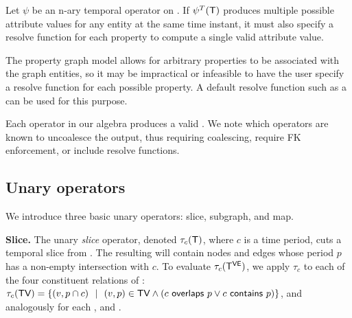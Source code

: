 \begin{lemma}
Let $\psi$ be an n-ary temporal operator on \tg.  If $\psi^T (\mathsf{T})$
produces multiple possible attribute values for any entity at the same
time instant, it must also specify a resolve function for each
property to compute a single valid attribute value.
\end{lemma}

The property graph model allows for arbitrary properties to be
associated with the graph entities, so it may be impractical or
infeasible to have the user specify a resolve function for each
possible property.  A default resolve function such as a 
can be used for this purpose.


Each operator in our algebra produces a valid \tg.  We note which
operators are known to uncoalesce the output, thus requiring
coalescing, require FK enforcement, or include resolve functions.

\subsection{Unary operators}
\label{sec:algebra:unary}

We introduce three basic unary operators: slice, subgraph, and map.

{\bf Slice.}  The unary {\em slice} operator, denoted $\tau_c (\mathsf{T})$,
where $c$ is a time period, cuts a temporal slice from \ttt.  The
resulting \tg will contain nodes and edges whose period $p$ has a
non-empty intersection with $c$.  To evaluate $\tau_c (\mathsf{T^{VE}})$, we
apply $\tau_c$ to each of the four constituent relations of \tve:
$\tau_c (\textsf{TV}) = \{ (v, p \cap c)~~|~~(v, p) \in \textsf{TV} \wedge
(c~\mathsf{overlaps}~p \vee c~\mathsf{contains}~p) \}$, and
analogously for each \te, \tav and \tae.


